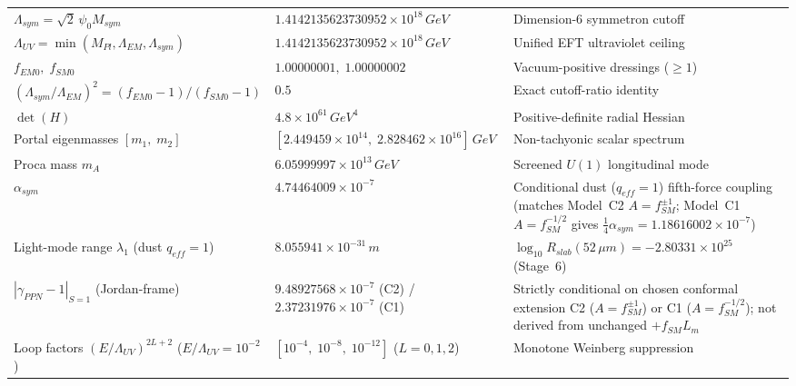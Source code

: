 \documentclass[american,11pt,letterpaper]{article}
\def\mathcal#1{#1}%
\def\mathrm#1{#1}%
\begin{document}
\begin{table}[htbp]
\begin{tabular}{|>{\raggedright\arraybackslash}p{5.5cm}|>{\raggedright\arraybackslash}p{4.3cm}|>{\raggedright\arraybackslash}p{5.0cm}|}
$\Lambda_{\mathrm{sym}} = \sqrt{2}\,\psi_0 M_{\mathrm{sym}}$ & $1.4142135623730952 \times 10^{18}\,\mathrm{GeV}$ & Dimension-6 symmetron cutoff \\
$\Lambda_{\mathrm{UV}} = \min(M_{\mathrm{Pl}},\Lambda_{\mathrm{EM}},\Lambda_{\mathrm{sym}})$ & $1.4142135623730952 \times 10^{18}\,\mathrm{GeV}$ & Unified EFT ultraviolet ceiling \\
$f_{\mathrm{EM}0},\;f_{\mathrm{SM}0}$ & $1.00000001,\;1.00000002$ & Vacuum-positive dressings ($\ge 1$) \\
$(\Lambda_{\mathrm{sym}}/\Lambda_{\mathrm{EM}})^2 = (f_{\mathrm{EM}0}-1)/(f_{\mathrm{SM}0}-1)$ & $0.5$ & Exact cutoff-ratio identity \\
$\det(H)$ & $4.8 \times 10^{61}\,\mathrm{GeV}^4$ & Positive-definite radial Hessian \\
Portal eigenmasses $[m_1,\;m_2]$ & $[2.449459\times 10^{14},\;2.828462\times 10^{16}]\,\mathrm{GeV}$ & Non-tachyonic scalar spectrum \\
Proca mass $m_A$ & $6.05999997 \times 10^{13}\,\mathrm{GeV}$ & Screened $U(1)$ longitudinal mode \\
$\alpha_{\mathrm{sym}}$ & $4.74464009 \times 10^{-7}$ & Conditional dust ($q_{\mathrm{eff}}=1$) fifth-force coupling (matches Model~C2 $A=f_{\mathrm{SM}}^{\pm 1}$; Model~C1 $A=f_{\mathrm{SM}}^{-1/2}$ gives $\frac{1}{4}\alpha_{\mathrm{sym}} = 1.18616002\times 10^{-7}$) \\
Light-mode range $\lambda_1$ (dust $q_{\mathrm{eff}}=1$) & $8.055941 \times 10^{-31}\,\mathrm{m}$ & $\log_{10} R_{\mathrm{slab}}(52\,\mu\mathrm{m}) = -2.80331\times 10^{25}$ (Stage~6) \\
$|\gamma_{\mathrm{PPN}} - 1|_{S=1}$ (Jordan-frame) & $9.48927568 \times 10^{-7}$ (C2) / $2.37231976 \times 10^{-7}$ (C1) & Strictly conditional on chosen conformal extension C2 ($A=f_{\mathrm{SM}}^{\pm 1}$) or C1 ($A=f_{\mathrm{SM}}^{-1/2}$); not derived from unchanged $+f_{\mathrm{SM}}\mathcal{L}_m$ \\
Loop factors $(E/\Lambda_{\mathrm{UV}})^{2L+2}$ ($E/\Lambda_{\mathrm{UV}}=10^{-2}$) & $[10^{-4},\;10^{-8},\;10^{-12}]$ ($L=0,1,2$) & Monotone Weinberg suppression \\
\hline
\end{tabular}
\end{table}
\end{document}
